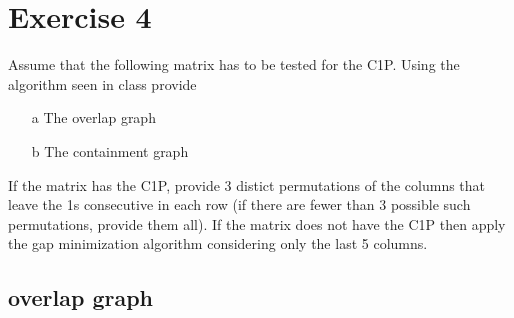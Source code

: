 \documentclass[]{article}
\begin{document}
\section{Exercise 4}

Assume that the following matrix has to be tested for the C1P. Using the algorithm seen in class provide
\begin{enumerate}

\item[a] The overlap graph
\item[b] The containment graph

\end{enumerate}

If the matrix has the C1P, provide 3 distict permutations of the columns that leave the 1s consecutive
in each row (if there are fewer than 3 possible such permutations, provide them all). If the matrix does not have the C1P then apply the gap minimization algorithm considering only the last 5 columns.

%
%
%
%
%
%

%
%

\subsection{overlap graph}
\end{document}
